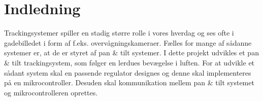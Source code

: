 \section*{Indledning}
Trackingsystemer spiller en stadig større rolle i vores hverdag og ses ofte i gadebilledet i form 
af f.eks. overvågningskameraer.
Fælles for mange af sådanne systemer er, at de er styret af pan \& tilt systemer. 
I dette projekt udvikles et pan \& tilt trackingsystem, som følger en lerdues bevægelse i 
luften. For at udvikle et sådant system skal en passende regulator designes og denne skal implementeres
på en mikrocontroller. 
Desuden skal kommunikation mellem pan \& tilt systemet og mikrocontrolleren oprettes.
